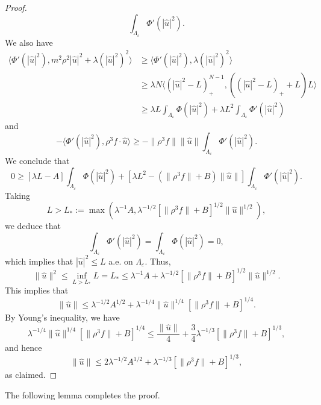 \documentclass{article}
\numberwithin{equation}{section}
\newcommand{\assign}{:=}
\theoremstyle{plain}
\theoremstyle{definition}
\begin{document}
\begin{proof}
\[     \int_{\Lambda_{\varepsilon}} \Phi' (| \hat{u} |^2) . \]
  We also have
  \[ \begin{aligned}
       \langle \Phi' (| \hat{u} |^2), m^2 \rho^2  | \hat{u} |^2 + \lambda (|
       \hat{u} |^2)^2 \rangle & \geqslant  \langle \Phi' (| \hat{u} |^2),
       \lambda (| \hat{u} |^2)^2 \rangle\\
       & \geqslant  \lambda N \langle (| \hat{u} |^2 - L)^{N - 1}_+, ((|
       \hat{u} |^2 - L)_+ + L) L \rangle\\
       & \geqslant  \lambda L \int_{\Lambda_{\varepsilon}} \Phi  (| \hat{u}
       |^2) + \lambda L^2 \int_{\Lambda_{\varepsilon}} \Phi' (| \hat{u} |^2)
     \end{aligned} \]
  and
  \[ - \langle \Phi' (| \hat{u} |^2), \rho^3 f \cdot \hat{u} \rangle \geqslant
     - \| \rho^3 f \|  \| \hat{u} \| \int_{\Lambda_{\varepsilon}} \Phi' (|
     \hat{u} |^2) . \]
  We conclude that
  \[ 0 \geqslant [\lambda L - A] \int_{\Lambda_{\varepsilon}} \Phi (| \hat{u}
     |^2) + [\lambda L^2 - (\| \rho^3 f \| + B)  \| \hat{u} \|]
     \int_{\Lambda_{\varepsilon}} \Phi' (| \hat{u} |^2) . \]
  Taking
  \[ L > L_{\ast} \assign \max (\lambda^{- 1} A, \lambda^{- 1 / 2} [\| \rho^3
     f \| + B]^{1 / 2}  \| \hat{u} \|^{1 / 2}), \]
  we deduce that
  \[ \int_{\Lambda_{\varepsilon}} \Phi ' (| \hat{u} |^2) =
     \int_{\Lambda_{\varepsilon}} \Phi (| \hat{u} |^2) = 0, \]
  which implies that $| \hat{u} |^2 \leqslant L$ a.e. on
  $\Lambda_{\varepsilon}$. Thus,
  \[ \| \hat{u} \|^2 \leqslant \inf_{L > L_{\ast}} L = L_{\ast} \leqslant
     \lambda^{- 1} A + \lambda^{- 1 / 2} [\| \rho^3 f \| + B]^{1 / 2} \|
     \hat{u} \|^{1 / 2} . \]
  This implies that
  \[ \| \hat{u} \| \leqslant \lambda^{- 1 / 2} A^{1 / 2} + \lambda^{- 1 / 4} 
     \| \hat{u} \|^{1 / 4}  [\| \rho^3 f \| + B]^{1 / 4} . \]
  By Young's inequality, we have
  \[ \lambda^{- 1 / 4}  \| \hat{u} \|^{1 / 4}  [\| \rho^3 f \| + B]^{1 / 4}
     \leqslant \frac{\| \hat{u} \|}{4} + \frac{3}{4} \lambda^{- 1 / 3}  [\|
     \rho^3 f \| + B]^{1 / 3}, \]
  and hence
  \[ \| \hat{u} \| \leqslant 2 \lambda^{- 1 / 2} A^{1 / 2} + \lambda^{- 1 / 3}
     [\| \rho^3 f \| + B]^{1 / 3}, \]
  as claimed.
\end{proof}

The following lemma completes the proof.
\end{document}
